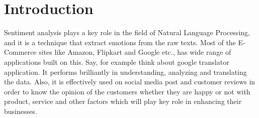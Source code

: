 

\maketitle

  

  




\section{Introduction}
Sentiment analysis plays a key role in the field of Natural Language Processing, and it is a technique that extract emotions from the raw texts. Most of the E-Commerce sites like Amazon, Flipkart and Google etc., has wide range of applications built on this. Say, for example think about google translator application. It performs brilliantly in understanding, analyzing and translating the data. Also, it is effectively used on social media post and customer reviews in order to know the opinion of the customers whether they are happy or not with product, service and other factors which will play key role in enhancing their businesses. 
